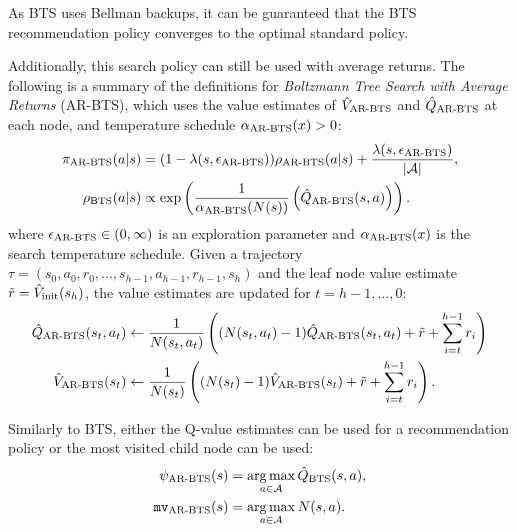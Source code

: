         As BTS uses Bellman backups, it can be guaranteed that the BTS recommendation policy converges to the optimal standard policy. 
        









        Additionally, this search policy can still be used with average returns. The following is a summary of the definitions for \textit{Boltzmann Tree Search with Average Returns} (AR-BTS), which uses the value estimates of ${\hat{V}_{{\textnormal{AR-BTS}}}}$ and ${\hat{Q}_{{\textnormal{AR-BTS}}}}$ at each node, and temperature schedule ${\alpha_{{\textnormal{AR-BTS}}}}(x) > 0$:
        \begin{align}
            {\pi_{{\textnormal{AR-BTS}}}}(a|s) &= (1-{\lambda(s,{\epsilon_{{\textnormal{AR-BTS}}}})}){\rho_{{\textnormal{AR-BTS}}}}(a|s) + \frac{{\lambda(s,{\epsilon_{{\textnormal{AR-BTS}}}})}}{|\mathcal{A}|}, 
                        \label{eq:arbts_search_policy} \\ 
            {\rho_{{\textnormal{BTS}}}}(a|s) &\propto \exp\left(\frac{1}{{\alpha_{{\textnormal{AR-BTS}}}}(N(s))}\left({\hat{Q}_{{\textnormal{AR-BTS}}}}(s,a)\right)\right).
                        \label{eq:arbts_value_policy}
        \end{align}
        where ${\epsilon_{{\textnormal{AR-BTS}}}} \in (0,\infty)$ is an exploration parameter and ${\alpha_{{\textnormal{AR-BTS}}}}(x)$ is the search temperature schedule. Given a trajectory $\tau=(s_0,a_0,r_0,...,s_{h-1},a_{h-1},r_{h-1},s_h)$ and the leaf node value estimate $\tilde{r} = {\hat{V}_{\textnormal{init}}}(s_h)$, the value estimates are updated for $t=h-1,...,0$:
        \begin{align}
            {\hat{Q}_{{\textnormal{AR-BTS}}}}(s_t,a_t) &\leftarrow 
                \frac{1}{N(s_t,a_t)} \left( (N(s_t,a_t)-1) {\hat{Q}_{{\textnormal{AR-BTS}}}}(s_t,a_t) 
                    + \tilde{r} + \sum_{i=t}^{h-1} r_i \right) \label{eq:4:arbsts_backup_q} \\
            {\hat{V}_{{\textnormal{AR-BTS}}}}(s_t) &\leftarrow 
                \frac{1}{N(s_t)} \left( (N(s_t)-1) {\hat{V}_{{\textnormal{AR-BTS}}}}(s_t) 
                    + \tilde{r} + \sum_{i=t}^{h-1} r_i \right). \label{eq:4:arbsts_backup_v} 
        \end{align}

        Similarly to BTS, either the Q-value estimates can be used for a recommendation policy or the most visited child node can be used:
        \begin{align}
            {\psi_{{\textnormal{AR-BTS}}}}(s) &= \operatorname*{arg\,max}_{a\in\mathcal{A}}{\hat{Q}_{{\textnormal{BTS}}}}(s,a), \\
            \texttt{mv}_{{\textnormal{AR-BTS}}}(s) &= \operatorname*{arg\,max}_{a\in\mathcal{A}} N(s,a).
        \end{align}








